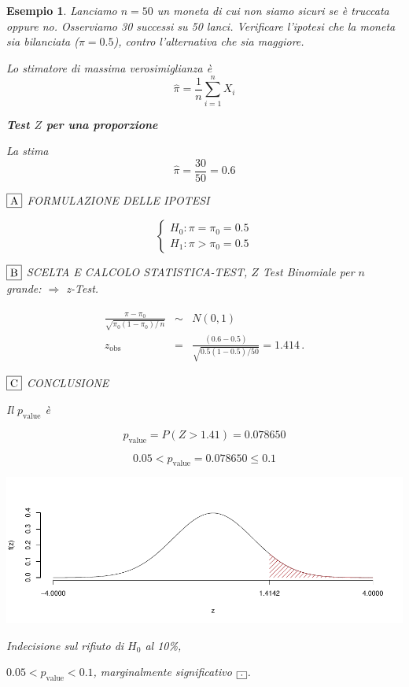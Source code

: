 \documentclass[
  11pt,
]{book}
\theoremstyle{mytheoremstyle}
\theoremstyle{mydefstyle}
\newtheorem{example}{{Esempio}}[section]
\begin{document}
\begin{example}
Lanciamo \(n=50\) un moneta di cui non siamo sicuri se è truccata oppure
no. Osserviamo 30 successi su 50 lanci. Verificare l'ipotesi che la moneta sia
bilanciata (\(\pi=0.5\)), contro l'alternativa che sia maggiore.

Lo stimatore di massima verosimiglianza è
\[\hat\pi=\frac 1 n \sum_{i=1}^n X_i\]

\textbf{Test \(Z\) per una proporzione}

La stima
\[\hat\pi=\frac { 30 } { 50 }= 0.6  \]

\(\fbox{A}\) FORMULAZIONE DELLE IPOTESI

\[\begin{cases}
   H_0: \pi = \pi_0=0.5 \\
   H_1: \pi > \pi_0=0.5 
   \end{cases}\]

\(\fbox{B}\) SCELTA E CALCOLO STATISTICA-TEST, \(Z\)
Test Binomiale per \(n\) grande: \(\Rightarrow\) z-Test.

\begin{eqnarray*}
   \frac{\hat\pi - \pi_{0}} {\sqrt {\pi_0(1-\pi_0)/\,n}}&\sim&N(0,1)\\
   z_{\text{obs}}
   &=& \frac{ ( 0.6 -  0.5 )} {\sqrt{ 0.5 (1- 0.5 )/ 50 }}
   =   1.414 \,.
   \end{eqnarray*}

\(\fbox{C}\) CONCLUSIONE

Il \(p_{\text{value}}\) è

\[ p_{\text{value}} = P(Z>1.41)=0.078650 \]

\[
 0.05 < p_\text{value}= 0.078650 \leq 0.1 
\]

\begin{center}\includegraphics{Appunti_di_Statistica_2025_files/figure-latex/15-test-mu-pi-9-1} \end{center}

Indecisione sul rifiuto di \(H_0\) al 10\%,

\(0.05<p_\text{value}<0.1\), \emph{marginalmente significativo} \(\fbox{.}\).
\end{example}
\end{document}
